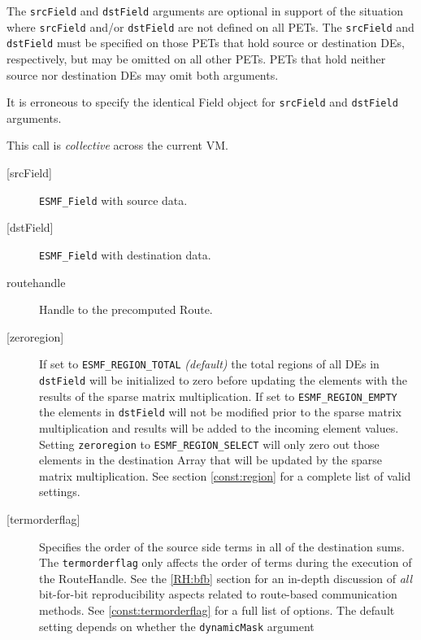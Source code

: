      The {\tt srcField} and {\tt dstField} arguments are optional in support of
     the situation where {\tt srcField} and/or {\tt dstField} are not defined on
     all PETs. The {\tt srcField} and {\tt dstField} must be specified on those
     PETs that hold source or destination DEs, respectively, but may be omitted
     on all other PETs. PETs that hold neither source nor destination DEs may
     omit both arguments.
  
     It is erroneous to specify the identical Field object for {\tt srcField} and
     {\tt dstField} arguments.
  
     This call is {\em collective} across the current VM.
  
     \begin{description}
     \item [{[srcField]}]
       {\tt ESMF\_Field} with source data.
     \item [{[dstField]}]
       {\tt ESMF\_Field} with destination data.
     \item [routehandle]
       Handle to the precomputed Route.
     \item [{[zeroregion]}]
       \begin{sloppypar}
       If set to {\tt ESMF\_REGION\_TOTAL} {\em (default)} the total regions of
       all DEs in {\tt dstField} will be initialized to zero before updating the 
       elements with the results of the sparse matrix multiplication. If set to
       {\tt ESMF\_REGION\_EMPTY} the elements in {\tt dstField} will not be
       modified prior to the sparse matrix multiplication and results will be
       added to the incoming element values. Setting {\tt zeroregion} to 
       {\tt ESMF\_REGION\_SELECT} will only zero out those elements in the 
       destination Array that will be updated by the sparse matrix
       multiplication. See section \ref{const:region} for a complete list of
       valid settings.
       \end{sloppypar}
     \item [{[termorderflag]}]
       Specifies the order of the source side terms in all of the destination
       sums. The {\tt termorderflag} only affects the order of terms during 
       the execution of the RouteHandle. See the \ref{RH:bfb} section for an
       in-depth discussion of {\em all} bit-for-bit reproducibility
       aspects related to route-based communication methods.
       See \ref{const:termorderflag} for a full list of options.
       The default setting depends on whether the {\tt dynamicMask} argument

\end{description}
